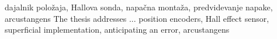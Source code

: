 \documentclass[a4paper,twoside,openright,12pt]{book}
\begin{document}
%
%
%
%
\kljucnebesede  dajalnik položaja, Hallova sonda, napačna montaža, predvidevanje napake, arcustangens
%
%
\abstract
%
The thesis addresses ...
%
\keywords position encoders, Hall effect sensor, superficial implementation, anticipating an error, arcustangens
%
%














\end{document}
